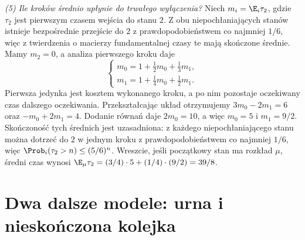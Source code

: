 \begin{przyklad}
\emph{(5) Ile kroków średnio upłynie do trwałego wyłączenia?}
Niech $m_i=\E_i\tau_2$, gdzie $\tau_2$
jest pierwszym czasem wejścia do stanu $2$.
Z obu niepochłaniających stanów istnieje
bezpośrednie przejście do $2$ z prawdopodobieństwem
co najmniej $1/6$, więc z twierdzenia o macierzy
fundamentalnej czasy te mają skończone średnie.
Mamy $m_2=0$, a analiza pierwszego kroku daje
\[
\begin{cases}
m_0=1+\frac12m_0+\frac13m_1,\\[2pt]
m_1=1+\frac14m_0+\frac12m_1.
\end{cases}
\]
Pierwsza jedynka jest kosztem wykonanego kroku,
a po nim pozostaje oczekiwany czas dalszego
oczekiwania. Przekształcając układ otrzymujemy
$3m_0-2m_1=6$ oraz $-m_0+2m_1=4$.
Dodanie równań daje $2m_0=10$, a więc
$m_0=5$ i $m_1=9/2$.
Skończoność tych średnich jest uzasadniona:
z każdego niepochłaniającego stanu można dotrzeć
do $2$ w jednym kroku z prawdopodobieństwem
co najmniej $1/6$, więc
$\Prob_i(\tau_2>n)\leq(5/6)^n$.
Wreszcie, jeśli początkowy stan ma rozkład $\mu$,
średni czas wynosi
$\E_\mu\tau_2=(3/4)\cdot5+(1/4)\cdot(9/2)=39/8$.
\end{przyklad}

\section{Dwa dalsze modele: urna i nieskończona kolejka}

